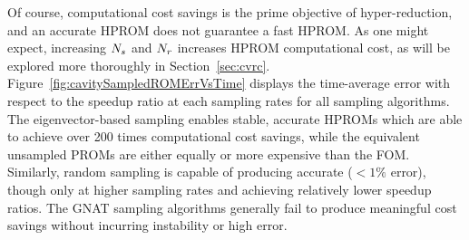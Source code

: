 Of course, computational cost savings is the prime objective of hyper-reduction, and an accurate HPROM does not guarantee a fast HPROM. As one might expect, increasing $N_s$ and $N_r$ increases HPROM computational cost, as will be explored more thoroughly in Section~\ref{sec:cvrc}. Figure~\ref{fig:cavitySampledROMErrVsTime} displays the time-average error with respect to the speedup ratio at each sampling rates for all sampling algorithms. The eigenvector-based sampling enables stable, accurate HPROMs which are able to achieve over 200 times computational cost savings, while the equivalent unsampled PROMs are either equally or more expensive than the FOM. Similarly, random sampling is capable of producing accurate ($<1\%$ error), though only at higher sampling rates and achieving relatively lower speedup ratios. The GNAT sampling algorithms generally fail to produce meaningful cost savings without incurring instability or high error.

